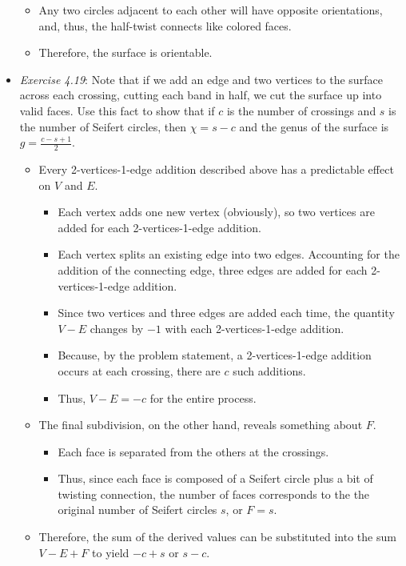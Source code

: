 \documentclass[titlepage]{article}
\numberwithin{figure}{section}
\numberwithin{table}{section}
\numberwithin{equation}{section}
\begin{document}
\begin{itemize}
\begin{itemize}
        \item Any two circles adjacent to each other will have opposite orientations, and, thus, the half-twist connects like colored faces.
        \item Therefore, the surface is orientable.
    \end{itemize}
    \item \emph{Exercise 4.19}: Note that if we add an edge and two vertices to the surface across each crossing, cutting each band in half, we cut the surface up into valid faces. Use this fact to show that if $c$ is the number of crossings and $s$ is the number of Seifert circles, then $\chi=s-c$ and the genus of the surface is $g=\frac{c-s+1}{2}$.
    \begin{itemize}
        \item Every 2-vertices-1-edge addition described above has a predictable effect on $V$ and $E$.
        \begin{itemize}
            \item Each vertex adds one new vertex (obviously), so two vertices are added for each 2-vertices-1-edge addition.
            \item Each vertex splits an existing edge into two edges. Accounting for the addition of the connecting edge, three edges are added for each 2-vertices-1-edge addition.
            \item Since two vertices and three edges are added each time, the quantity $V-E$ changes by $-1$ with each 2-vertices-1-edge addition.
            \item Because, by the problem statement, a 2-vertices-1-edge addition occurs at each crossing, there are $c$ such additions.
            \item Thus, $V-E=-c$ for the entire process.
        \end{itemize}
        \item The final subdivision, on the other hand, reveals something about $F$.
        \begin{itemize}
            \item Each face is separated from the others at the crossings.
            \item Thus, since each face is composed of a Seifert circle plus a bit of twisting connection, the number of faces corresponds to the the original number of Seifert circles $s$, or $F=s$.
        \end{itemize}
        \item Therefore, the sum of the derived values can be substituted into the sum $V-E+F$ to yield $-c+s$ or $s-c$.

\end{itemize}
\end{itemize}
\end{document}

